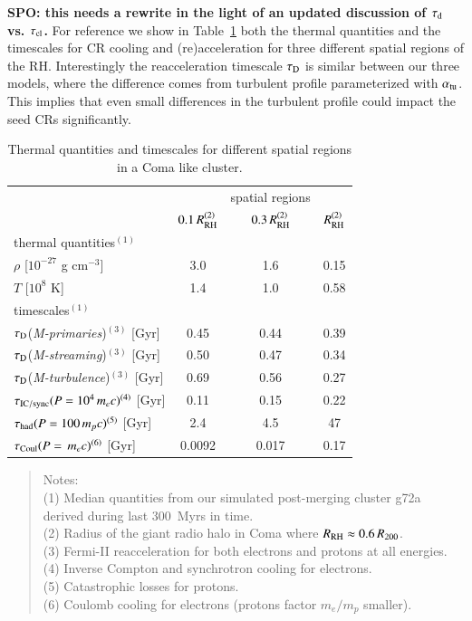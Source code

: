 \documentclass[fleqn,usenatbib,useAMS]{mnras}
\newcommand{\Mstream}{{\it M-streaming}\xspace}
\newcommand{\Mflatturb}{{\it M-turbulence}\xspace}
\newcommand{\Mprimary}{{\it M-primaries}\xspace}
\newcommand{\RH}{R_\rmn{RH}}
\def\SPO#1{{\bf {\color{red} SPO: #1}}}
\begin{document}
\SPO{this needs a rewrite in the light of an updated discussion of
  $\tau_{\mathrm{d}}$ vs. $\tau_{{\mathrm{cl}}}$.}  For reference we show in
Table~\ref{tab:timescales} both the thermal quantities and the
timescales for CR cooling and (re)acceleration for three different
spatial regions of the RH. Interestingly the reacceleration timescale
$\tau_{\rm D}$ is similar between our three models, where the
difference comes from turbulent profile parameterized with
$\alpha_{\mathrm{tu}}$. This implies that even small differences in the
turbulent profile could impact the seed CRs significantly.

\begin{table}
  \caption{Thermal quantities and timescales for different spatial
    regions in a Coma like cluster.}
\begin{tabular}{l c  c c}
\hline
\hline
& & spatial regions & \\
 & $0.1\,\RH^{(2)}$ & $0.3\,\RH^{(2)}$ & $\RH^{(2)}$   \\
\hline
thermal quantities$^{(1)}$ & & & \\
$\rho$ [$10^{-27}$ g cm$^{-3}$] & 3.0 & 1.6 & 0.15 \\
$T$ [$10^{8}$ K] & 1.4 & 1.0 & 0.58 \\
\hline
timescales$^{(1)}$ & & & \\
$\tau_{\mathrm{D}}$(\Mprimary)$^{(3)}$ [Gyr] & 0.45 & 0.44 & 0.39 \\
$\tau_{\mathrm{D}}$(\Mstream)$^{(3)}$  [Gyr] & 0.50 & 0.47 & 0.34 \\
$\tau_{\mathrm{D}}$(\Mflatturb)$^{(3)}$  [Gyr] & 0.69 & 0.56 & 0.27 \\
$\tau_{\mathrm{IC/sync}}(P=10^4\,m_ec)^{(4)}$ [Gyr] & 0.11 & 0.15 & 0.22 \\
$\tau_{\mathrm{had}}(P=100\,m_pc)^{(5)}$ [Gyr] & 2.4 & 4.5 & 47 \\
$\tau_{\mathrm{Coul}}(P=\,m_ec)^{(6)}$  [Gyr] & 0.0092 & 0.017 & 0.17 \\
\hline
\end{tabular}
\begin{quote}
 Notes: \\ 
 (1) Median quantities from our simulated post-merging cluster g72a derived 
 during last 300~Myrs in time. \\
 (2) Radius of the giant radio halo in Coma where $\RH\approx0.6\,R_{200}$.\\
 (3) Fermi-II reacceleration for both electrons and protons at all energies.\\
 (4) Inverse Compton and synchrotron cooling for electrons.\\
 (5) Catastrophic losses for protons.\\
 (6) Coulomb cooling for electrons (protons factor $m_e/m_p$ smaller).\\
 \label{tab:timescales}
  \end{quote}
\end{table} 
\end{document}
